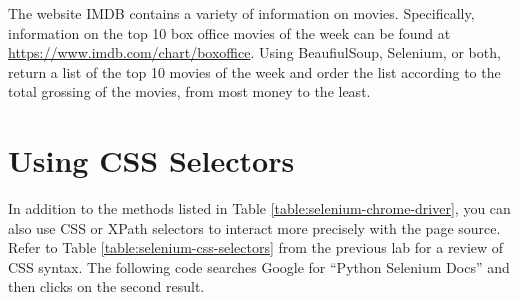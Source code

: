 \begin{comment} %
To illustrate that using Selenium solves the problem of asynchronously-loaded content, use it to load the soccer statistics page from the previous example.
\begin{lstlisting}
>>> browser = webdriver.Chrome()
>>> soccer_url = "http://www.simplesoccerstats.com/stats/teamstats.php?lge=14&type=goals&season=0"
>>> browser.get(soccer_url)
>>> soccer_soup = BeautifulSoup(browser.page_source)
>>> browser.quit() # Closes the web browser.
>>> print(soccer_soup.find(string='Chicago').parent)
<<<td>Chicago</td>>>
\end{lstlisting}
Notice that there is now a tag containing \li{"Chicago"}.
\end{comment}

\begin{problem} %
The website IMDB contains a variety of information on movies.
Specifically, information on the top 10 box office movies of the week can be found at \url{https://www.imdb.com/chart/boxoffice}.
Using BeaufiulSoup, Selenium, or both, return a list of the top 10 movies of the week and order the list according to the total grossing of the movies, from most money to the least.
\end{problem}

\section*{Using CSS Selectors}%

In addition to the methods listed in Table \ref{table:selenium-chrome-driver}, you can also use CSS or XPath selectors to interact more precisely with the page source.
Refer to Table \ref{table:selenium-css-selectors} from the previous lab for a review of CSS syntax.
The following code searches Google for ``Python Selenium Docs'' and then clicks on the second result.

